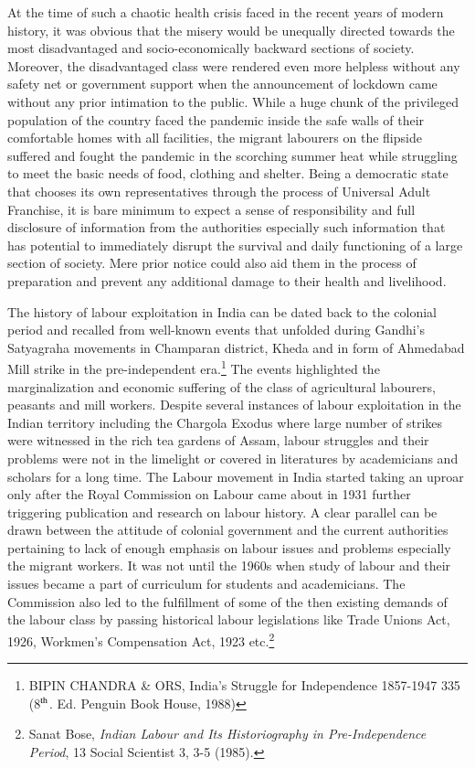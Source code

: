 \begin{multicols}{2}
\vspace{-.1cm}

\noi
At the time of such a chaotic health crisis faced in the recent years of modern history, it was
obvious that the misery would be unequally directed towards the most disadvantaged and socio-economically backward sections of society. Moreover, the disadvantaged class were
rendered even more helpless without any safety net or government support when the
announcement of lockdown came without any prior intimation to the public. While a huge
chunk of the privileged population of the country faced the pandemic inside the safe walls of
their comfortable homes with all facilities, the migrant labourers on the flipside suffered and
fought the pandemic in the scorching summer heat while struggling to meet the basic needs
of food, clothing and shelter. Being a democratic state that chooses its own representatives
through the process of Universal Adult Franchise, it is bare minimum to expect a sense of
responsibility and full disclosure of information from the authorities especially such
information that has potential to immediately disrupt the survival and daily functioning of a
large section of society. Mere prior notice could also aid them in the process of preparation
and prevent any additional damage to their health and livelihood. 


\noi
The history of labour exploitation in India can be dated back to the colonial period and
recalled from well-known events that unfolded during Gandhi’s Satyagraha movements in
Champaran district, Kheda and in form of Ahmedabad Mill strike in the pre-independent era.\footnote{ BIPIN CHANDRA \& ORS, India's Struggle for Independence 1857-1947 335 (8$^{\rm th}$. Ed. Penguin Book House,
1988)}
 The events highlighted the marginalization and economic suffering of the class of
agricultural labourers, peasants and mill workers. Despite several instances of labour
exploitation in the Indian territory including the Chargola Exodus where large number of
strikes were witnessed in the rich tea gardens of Assam, labour struggles and their problems
were not in the limelight or covered in literatures by academicians and scholars for a long
time. The Labour movement in India started taking an uproar only after the Royal
Commission on Labour came about in 1931 further triggering publication and research on
labour history. A clear parallel can be drawn between the attitude of colonial government and
the current authorities pertaining to lack of enough emphasis on labour issues and problems
especially the migrant workers. It was not until the 1960s when study of labour and their
issues became a part of curriculum for students and academicians. The Commission also led to the fulfillment of some of the then existing demands of the labour class by passing
historical labour legislations like Trade Unions Act, 1926, Workmen’s Compensation Act,
1923 etc.\footnote{Sanat Bose, \textit{Indian Labour and Its Historiography in Pre-Independence Period}, 13 Social Scientist 3, 3-5
(1985).}


\end{multicols}
